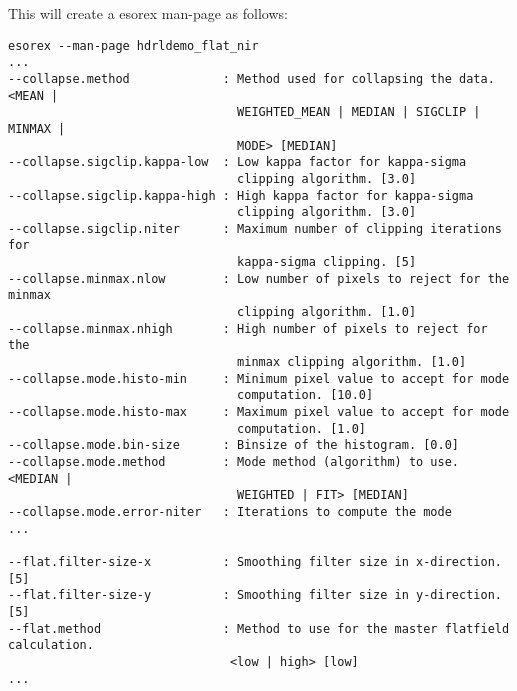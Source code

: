 This will create a esorex man-page as follows:
{\footnotesize
\begin{verbatim}
esorex --man-page hdrldemo_flat_nir
...
--collapse.method             : Method used for collapsing the data. <MEAN |
                                WEIGHTED_MEAN | MEDIAN | SIGCLIP | MINMAX | 
                                MODE> [MEDIAN]
--collapse.sigclip.kappa-low  : Low kappa factor for kappa-sigma
                                clipping algorithm. [3.0]
--collapse.sigclip.kappa-high : High kappa factor for kappa-sigma
                                clipping algorithm. [3.0]
--collapse.sigclip.niter      : Maximum number of clipping iterations for
                                kappa-sigma clipping. [5]
--collapse.minmax.nlow        : Low number of pixels to reject for the minmax
                                clipping algorithm. [1.0]
--collapse.minmax.nhigh       : High number of pixels to reject for the
                                minmax clipping algorithm. [1.0]
--collapse.mode.histo-min     : Minimum pixel value to accept for mode
                                computation. [10.0]
--collapse.mode.histo-max     : Maximum pixel value to accept for mode
                                computation. [1.0]
--collapse.mode.bin-size      : Binsize of the histogram. [0.0]
--collapse.mode.method        : Mode method (algorithm) to use. <MEDIAN |
                                WEIGHTED | FIT> [MEDIAN]
--collapse.mode.error-niter   : Iterations to compute the mode
...

--flat.filter-size-x          : Smoothing filter size in x-direction. [5]
--flat.filter-size-y          : Smoothing filter size in y-direction. [5]
--flat.method                 : Method to use for the master flatfield calculation. 
                               <low | high> [low]
...
\end{verbatim}
}
